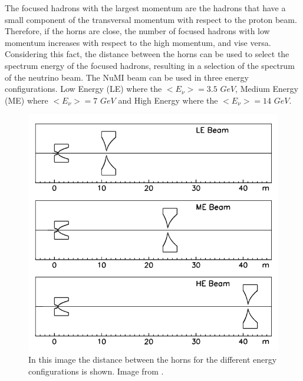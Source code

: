 The focused hadrons with the largest momentum are the hadrons that have a small component of the transversal momentum with respect to the proton beam. Therefore, if the horns are close, the number of focused hadrons with low momentum increases with respect to the high momentum, and vise versa. Considering this fact, the distance between the horns can be used to select the spectrum energy of the focused hadrons, resulting in a selection of the spectrum of the neutrino beam. The NuMI beam can be used in three energy configurations. Low Energy (LE) where the $<E_\nu>=3.5$ $GeV$, Medium Energy (ME) where $<E_\nu>=7$ $GeV$ and High Energy where the $<E_\nu> = 14$ $GeV$\cite{BeamOptics}. 

\begin{figure}[!htb]
\centering
\includegraphics[scale=0.4]{Figures/Chapter2/HornsDistance.png}
        \caption{In this image the distance between the horns for the different energy configurations is shown. Image from \cite{BeamOptics}.} 
\label{fig:MnvExp:NuMI:NuMIHornDistance}
\end{figure}

